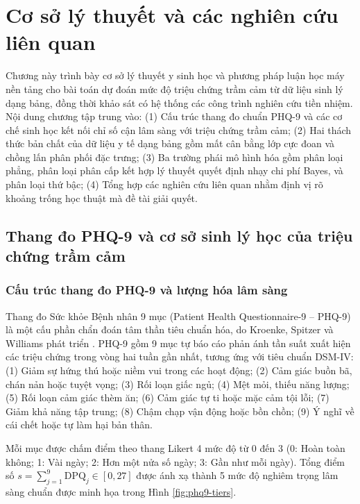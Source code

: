\chapter{Cơ sở lý thuyết và các nghiên cứu liên quan}
\label{ch:co-so-ly-thuyet}

Chương này trình bày cơ sở lý thuyết y sinh học và phương pháp luận học máy nền tảng cho bài toán dự đoán mức độ triệu chứng trầm cảm từ dữ liệu sinh lý dạng bảng, đồng thời khảo sát có hệ thống các công trình nghiên cứu tiền nhiệm. Nội dung chương tập trung vào: (1) Cấu trúc thang đo chuẩn PHQ-9 và các cơ chế sinh học kết nối chỉ số cận lâm sàng với triệu chứng trầm cảm; (2) Hai thách thức bản chất của dữ liệu y tế dạng bảng gồm mất cân bằng lớp cực đoan và chồng lấn phân phối đặc trưng; (3) Ba trường phái mô hình hóa gồm phân loại phẳng, phân loại phân cấp kết hợp lý thuyết quyết định nhạy chi phí Bayes, và phân loại thứ bậc; (4) Tổng hợp các nghiên cứu liên quan nhằm định vị rõ khoảng trống học thuật mà đề tài giải quyết.

\section{Thang đo PHQ-9 và cơ sở sinh lý học của triệu chứng trầm cảm}
\label{sec:thang-do-phq9-va-sinh-ly}

\subsection{Cấu trúc thang đo PHQ-9 và lượng hóa lâm sàng}
\label{subsec:cau-truc-phq9}

Thang đo Sức khỏe Bệnh nhân 9 mục (Patient Health Questionnaire-9 -- PHQ-9) là một cấu phần chẩn đoán tâm thần tiêu chuẩn hóa, do Kroenke, Spitzer và Williams phát triển \cite{kroenke2001phq, spitzer1999validation}. PHQ-9 gồm 9 mục tự báo cáo phản ánh tần suất xuất hiện các triệu chứng trong vòng hai tuần gần nhất, tương ứng với tiêu chuẩn DSM-IV: (1) Giảm sự hứng thú hoặc niềm vui trong các hoạt động; (2) Cảm giác buồn bã, chán nản hoặc tuyệt vọng; (3) Rối loạn giấc ngủ; (4) Mệt mỏi, thiếu năng lượng; (5) Rối loạn cảm giác thèm ăn; (6) Cảm giác tự ti hoặc mặc cảm tội lỗi; (7) Giảm khả năng tập trung; (8) Chậm chạp vận động hoặc bồn chồn; (9) Ý nghĩ về cái chết hoặc tự làm hại bản thân.

Mỗi mục được chấm điểm theo thang Likert 4 mức độ từ 0 đến 3 (0: Hoàn toàn không; 1: Vài ngày; 2: Hơn một nửa số ngày; 3: Gần như mỗi ngày). Tổng điểm số $s = \sum_{j=1}^9 \text{DPQ}_j \in [0, 27]$ được ánh xạ thành 5 mức độ nghiêm trọng lâm sàng chuẩn được minh họa trong Hình \ref{fig:phq9-tiers}.


